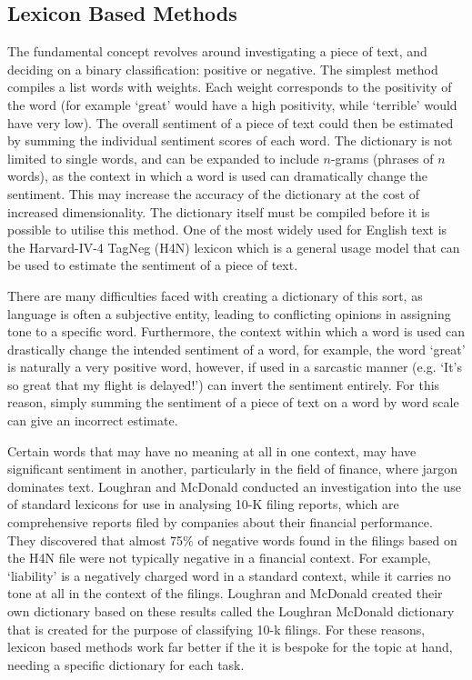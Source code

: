 \documentclass[ oneside,%
                    author={Joshua Felmeden},
                    degree={MEng},
                     title={Semantic Analysis of Financial Headlines Based on Realised Stock Returns},
                  subtitle={}]{dissertation}
\begin{document}
\subsection{Lexicon Based Methods}
The fundamental concept revolves around investigating a piece of text, and deciding on a binary classification: positive or negative. The simplest method compiles a list words with weights. Each weight corresponds to the positivity of the word (for example `great' would have a high positivity, while `terrible' would have very low). The overall sentiment of a piece of text could then be estimated by summing the individual sentiment scores of each word. The dictionary is not limited to single words, and can be expanded to include $n$-grams (phrases of $n$ words), as the context in which a word is used can dramatically change the sentiment. This may increase the accuracy of the dictionary at the cost of increased dimensionality. The dictionary itself must be compiled before it is possible to utilise this method. One of the most widely used for English text is the Harvard-IV-4 TagNeg (H4N) lexicon which is a general usage model that can be used to estimate the sentiment of a piece of text.

There are many difficulties faced with creating a dictionary of this sort, as language is often a subjective entity, leading to conflicting opinions in assigning tone to a specific word. Furthermore, the context within which a word is used can drastically change the intended sentiment of a word, for example, the word `great' is naturally a very positive word, however, if used in a sarcastic manner (e.g. `It's so great that my flight is delayed!') can invert the sentiment entirely. For this reason, simply summing the sentiment of a piece of text on a word by word scale can give an incorrect estimate.

Certain words that may have no meaning at all in one context, may have significant sentiment in another, particularly in the field of finance, where jargon dominates text. Loughran and McDonald \cite{lm-dict} conducted an investigation into the use of standard lexicons for use in analysing 10-K filing reports, which are comprehensive reports filed by companies about their financial performance. They discovered that almost 75\% of negative words found in the filings based on the H4N file were not typically negative in a financial context. For example, `liability' is a negatively charged word in a standard context, while it carries no tone at all in the context of the filings. Loughran and McDonald created their own dictionary based on these results called the Loughran McDonald dictionary that is created for the purpose of classifying 10-k filings. For these reasons, lexicon based methods work far better if the it is bespoke for the topic at hand, needing a specific dictionary for each task. 
\end{document}
